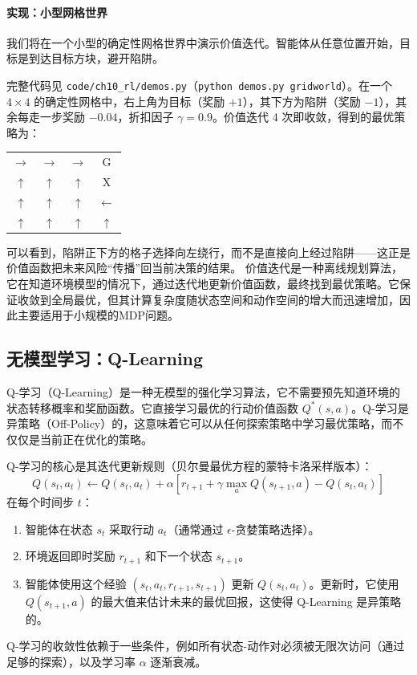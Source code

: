 \paragraph{实现：小型网格世界}
我们将在一个小型的确定性网格世界中演示价值迭代。智能体从任意位置开始，目标是到达目标方块，避开陷阱。

完整代码见 \texttt{code/ch10\_rl/demos.py}（\texttt{python demos.py gridworld}）。在一个 $4\times4$ 的确定性网格中，右上角为目标（奖励 $+1$），其下方为陷阱（奖励 $-1$），其余每走一步奖励 $-0.04$，折扣因子 $\gamma=0.9$。价值迭代 4 次即收敛，得到的最优策略为：
\begin{center}
\begin{tabular}{cccc}
$\rightarrow$ & $\rightarrow$ & $\rightarrow$ & G \\
$\uparrow$ & $\uparrow$ & $\uparrow$ & X \\
$\uparrow$ & $\uparrow$ & $\uparrow$ & $\leftarrow$ \\
$\uparrow$ & $\uparrow$ & $\uparrow$ & $\uparrow$ \\
\end{tabular}
\end{center}
可以看到，陷阱正下方的格子选择向左绕行，而不是直接向上经过陷阱——这正是价值函数把未来风险“传播”回当前决策的结果。
价值迭代是一种离线规划算法，它在知道环境模型的情况下，通过迭代地更新价值函数，最终找到最优策略。它保证收敛到全局最优，但其计算复杂度随状态空间和动作空间的增大而迅速增加，因此主要适用于小规模的MDP问题。

\subsection{无模型学习：Q-Learning}
Q-学习（Q-Learning）是一种无模型的强化学习算法，它不需要预先知道环境的状态转移概率和奖励函数。它直接学习最优的行动价值函数 $Q^*(s, a)$。Q-学习是异策略（Off-Policy）的，这意味着它可以从任何探索策略中学习最优策略，而不仅仅是当前正在优化的策略。

Q-学习的核心是其迭代更新规则（贝尔曼最优方程的蒙特卡洛采样版本）：
$$ Q(s_t, a_t) \leftarrow Q(s_t, a_t) + \alpha [r_{t+1} + \gamma \max_{a} Q(s_{t+1}, a) - Q(s_t, a_t)] $$
在每个时间步 $t$：
\begin{enumerate}
    \item 智能体在状态 $s_t$ 采取行动 $a_t$（通常通过 $\epsilon$-贪婪策略选择）。
    \item 环境返回即时奖励 $r_{t+1}$ 和下一个状态 $s_{t+1}$。
    \item 智能体使用这个经验 $(s_t, a_t, r_{t+1}, s_{t+1})$ 更新 $Q(s_t, a_t)$。更新时，它使用 $Q(s_{t+1}, a)$ 的最大值来估计未来的最优回报，这使得 Q-Learning 是异策略的。
\end{enumerate}
Q-学习的收敛性依赖于一些条件，例如所有状态-动作对必须被无限次访问（通过足够的探索），以及学习率 $\alpha$ 逐渐衰减。


